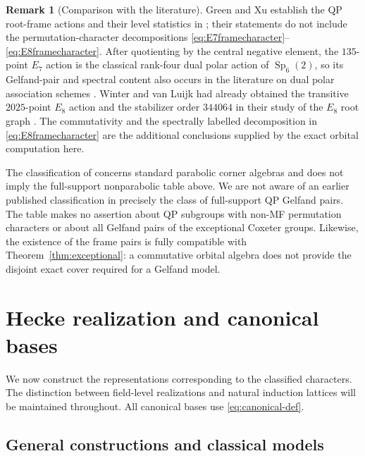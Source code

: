 \documentclass[11pt]{article}
\numberwithin{equation}{section}
\theoremstyle{definition}
\newtheorem{remark}[theorem]{Remark}
\DeclareMathOperator{\Sp}{Sp}
\begin{document}
\begin{remark}[Comparison with the literature]
Green and Xu establish the QP root-frame actions and their level
statistics in \cite{GXroots,GXFano}; their statements do not include
the permutation-character decompositions
\eqref{eq:E7framecharacter}--\eqref{eq:E8framecharacter}.
After quotienting by the central negative element, the \(135\)-point
\(E_7\) action is the classical rank-four dual polar action of
\(\Sp_6(2)\), so its Gelfand-pair and spectral content also occurs in
the literature on dual polar association schemes \cite{BCN}.
Winter and van Luijk had already obtained the transitive \(2025\)-point
\(E_8\) action and the stabilizer order \(344064\) in their study of
the \(E_8\) root graph \cite{WinterVanLuijk}.  The commutativity and
the spectrally labelled decomposition in
\eqref{eq:E8framecharacter} are the additional conclusions supplied
by the exact orbital computation here.

The classification of \cite{APVM} concerns standard parabolic corner
algebras and does not imply the full-support nonparabolic table above.
We are not aware of an earlier published classification in precisely
the class of full-support QP Gelfand pairs.
The table makes no assertion about QP subgroups with non-MF
permutation characters or about all Gelfand pairs of the exceptional
Coxeter groups.  Likewise, the existence of the frame pairs is fully
compatible with Theorem~\ref{thm:exceptional}: a commutative orbital
algebra does not provide the disjoint exact cover required for a
Gelfand model.
\end{remark}
\section{Hecke realization and canonical bases}
\label{sec:hecke}

We now construct the representations corresponding to the classified characters.
The distinction between field-level realizations and natural induction lattices will be maintained throughout.
All canonical bases use \eqref{eq:canonical-def}.

\subsection{General constructions and classical models}
\end{document}
